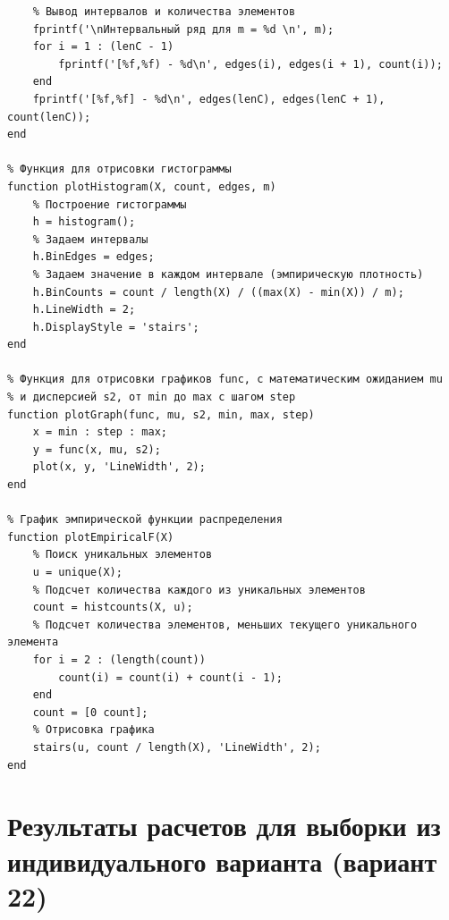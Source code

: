 \documentclass[a4paper,14pt]{extreport} %
\begin{document}
\begin{lstlisting}
    % Вывод интервалов и количества элементов
    fprintf('\nИнтервальный ряд для m = %d \n', m);
    for i = 1 : (lenC - 1)
        fprintf('[%f,%f) - %d\n', edges(i), edges(i + 1), count(i));
    end
    fprintf('[%f,%f] - %d\n', edges(lenC), edges(lenC + 1), count(lenC));
end

% Функция для отрисовки гистограммы
function plotHistogram(X, count, edges, m)
    % Построение гистограммы
    h = histogram();
    % Задаем интервалы
    h.BinEdges = edges;
    % Задаем значение в каждом интервале (эмпирическую плотность)
    h.BinCounts = count / length(X) / ((max(X) - min(X)) / m);
    h.LineWidth = 2;
    h.DisplayStyle = 'stairs';
end

% Функция для отрисовки графиков func, c математическим ожиданием mu 
% и дисперсией s2, от min до max с шагом step
function plotGraph(func, mu, s2, min, max, step)
    x = min : step : max;
    y = func(x, mu, s2);
    plot(x, y, 'LineWidth', 2);
end

% График эмпирической функции распределения
function plotEmpiricalF(X)
    % Поиск уникальных элементов
    u = unique(X);
    % Подсчет количества каждого из уникальных элементов
    count = histcounts(X, u);
    % Подсчет количества элементов, меньших текущего уникального элемента
    for i = 2 : (length(count))
        count(i) = count(i) + count(i - 1);
    end
    count = [0 count];
    % Отрисовка графика
    stairs(u, count / length(X), 'LineWidth', 2);
end
\end{lstlisting}

\section{Результаты расчетов для выборки из индивидуального варианта (вариант 22)} 
\end{document}
